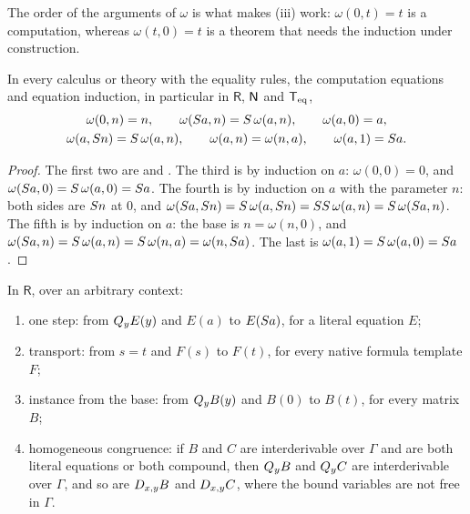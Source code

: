 The order of the arguments of $\omega$ is what makes (iii) work:
$\omega(0,t)=t$ is a computation, whereas $\omega(t,0)=t$ is a theorem that
needs the induction under construction.

\begin{lemma}
\label{kern:lem:orbit}
In every calculus or theory with the equality rules, the computation
equations and equation induction, in particular in $\mathsf{R}$, $\mathsf{N}$ and
$\mathsf{T}_{\mathrm{eq}}$,
\begin{gather*}
 \omega(0,n)=n,\qquad \omega(S a,n)=S\,\omega(a,n),\qquad
 \omega(a,0)=a,\\
 \omega(a,S n)=S\,\omega(a,n),\qquad
 \omega(a,n)=\omega(n,a),\qquad \omega(a,1)=S a .
\end{gather*}
\end{lemma}

\begin{proof}
The first two are  and .  The third is by
induction on $a$: $\omega(0,0)=0$, and
$\omega(S a,0)=S\,\omega(a,0)=S a$.  The fourth is by induction on
$a$ with the parameter $n$: both sides are $S n$ at $0$, and
$\omega(S a,S n)=S\,\omega(a,S n)=SS\,\omega(a,n)
=S\,\omega(S a,n)$.  The fifth is by induction on $a$: the base is
$n=\omega(n,0)$, and
$\omega(S a,n)=S\,\omega(a,n)=S\,\omega(n,a)=\omega(n,S a)$.
The last is $\omega(a,1)=S\,\omega(a,0)=S a$.
\end{proof}

\begin{lemma}
\label{kern:lem:rtransport}
In $\mathsf{R}$, over an arbitrary context:
\begin{enumerate}[label=\textup{(\roman*)}]
\item one step: from $Q_{y}E(y)$ and $E(a)$ to $E(S a)$, for a literal
 equation $E$;
\item transport: from $s=t$ and $F(s)$ to $F(t)$, for every native formula
 template $F$;
\item instance from the base: from $Q_{y}B(y)$ and $B(0)$ to $B(t)$, for
 every matrix $B$;
\item homogeneous congruence: if $B$ and $C$ are interderivable over
 $\Gamma$ and are both literal equations or both compound, then $Q_{y}B$
 and $Q_{y}C$ are interderivable over $\Gamma$, and so are $D_{x,y}B$ and
 $D_{x,y}C$, where the bound variables are not free in $\Gamma$.
\end{enumerate}
\end{lemma}

